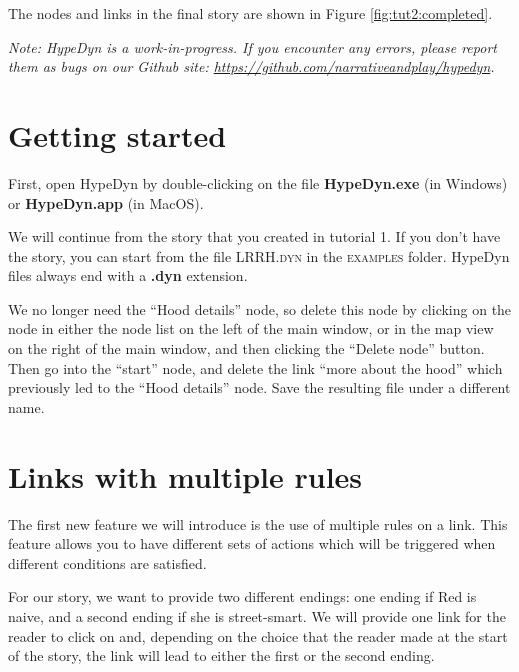 \documentclass{article}
\begin{document}
The nodes and links in the final story are shown in Figure \ref{fig:tut2:completed}.

\textit{Note:  HypeDyn is a work-in-progress. If you encounter any errors, please
report them as bugs on our Github site: \url{https://github.com/narrativeandplay/hypedyn}.}

\section{Getting started}

First, open HypeDyn by double-clicking on the file \textbf{HypeDyn.exe} (in
Windows) or \textbf{HypeDyn.app} (in MacOS).

We will continue from the story that you created in tutorial 1. If you don't
have the story, you can start from the file \textsc{LRRH.dyn} in the
\textsc{examples} folder. HypeDyn files always end with a \textbf{.dyn} extension.


We no longer need the ``Hood details'' node, so delete this node by clicking on
the node in either the node list on the left of the main window, or in the
map view on the right of the main window, and then clicking the ``Delete node''
button. Then go into the ``start'' node, and delete the link ``more about
the hood'' which previously led to the ``Hood details'' node. Save the resulting
file under a different name.


\section{Links with multiple rules}

The first new feature we will introduce is the use of multiple rules on a link.
This feature allows you to have different sets of actions which will be
triggered when different conditions are satisfied.

For our story, we want to provide two different endings: one ending if Red is
naive, and a second ending if she is street-smart. We will provide one link for
the reader to click on and, depending on the choice that the reader made at the
start of the story, the link will lead to either the first or the second ending.
\end{document}
